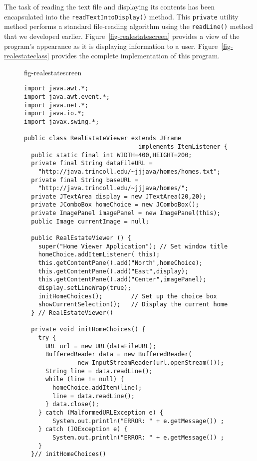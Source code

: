 {The task of reading the text file and displaying its contents has been
encapsulated into the {\tt readTextIntoDisplay()} method.  This
{\tt private} utility method performs a standard file-reading algorithm
using the {\tt readLine()} method that we developed
earlier.  Figure~\ref{fig-realestatescreen}
provides a view of the program's appearance as it is displaying
information to a user. Figure~\ref{fig-realestateclass} provides the complete
implementation of this program.

\begin{figure}[hbt]
{fig-realestatescreen}
\end{figure}

\begin{figure}[p]
\jjjprogstart
\begin{jjjlisting}
\begin{lstlisting}
import java.awt.*;
import java.awt.event.*;
import java.net.*;
import java.io.*;
import javax.swing.*;

public class RealEstateViewer extends JFrame 
                                implements ItemListener {
  public static final int WIDTH=400,HEIGHT=200;
  private final String dataFileURL =
    "http://java.trincoll.edu/~jjjava/homes/homes.txt";
  private final String baseURL = 
    "http://java.trincoll.edu/~jjjava/homes/";
  private JTextArea display = new JTextArea(20,20);
  private JComboBox homeChoice = new JComboBox();
  private ImagePanel imagePanel = new ImagePanel(this);
  public Image currentImage = null;

  public RealEstateViewer () {
    super("Home Viewer Application"); // Set window title
    homeChoice.addItemListener( this);
    this.getContentPane().add("North",homeChoice);
    this.getContentPane().add("East",display);
    this.getContentPane().add("Center",imagePanel);
    display.setLineWrap(true);
    initHomeChoices();        // Set up the choice box
    showCurrentSelection();   // Display the current home
  } // RealEstateViewer()

  private void initHomeChoices() {
    try {
      URL url = new URL(dataFileURL);
      BufferedReader data = new BufferedReader(
               new InputStreamReader(url.openStream()));
      String line = data.readLine();
      while (line != null) {
        homeChoice.addItem(line);
        line = data.readLine();
      } data.close();
    } catch (MalformedURLException e) {
        System.out.println("ERROR: " + e.getMessage()) ;
    } catch (IOException e) {
        System.out.println("ERROR: " + e.getMessage()) ;
    }
  }// initHomeChoices()
\end{lstlisting}
\end{jjjlisting}
\end{figure}


}
